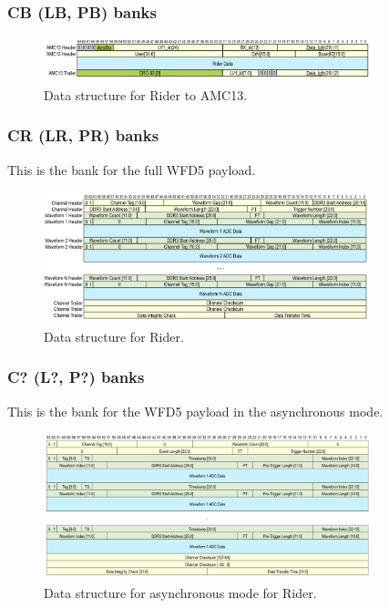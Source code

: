 \subsubsection*{CB (LB, PB) banks}

\begin{figure}[htbp]
\centering
\includegraphics[width=0.85\textwidth]{pics/RiderToAMC13.pdf} 
\caption{Data structure for Rider to AMC13.}\label{fig:RiderToAMC13}
\end{figure}

\subsubsection*{CR (LR, PR) banks}

This is the bank for the full WFD5 payload.

\begin{figure}[htbp]
\centering
\includegraphics[width=0.85\textwidth]{pics/RiderData.pdf} 
\caption{Data structure for Rider.}\label{fig:RiderData}
\end{figure}

\subsubsection*{C? (L?, P?) banks}

This is the bank for the WFD5 payload in the asynchronous mode.

\begin{figure}[htbp]
\centering
\includegraphics[width=0.85\textwidth]{pics/AsyncRiderData.pdf} 
\caption{Data structure for asynchronous mode for Rider.}\label{fig:AsyncRiderData}
\end{figure}

